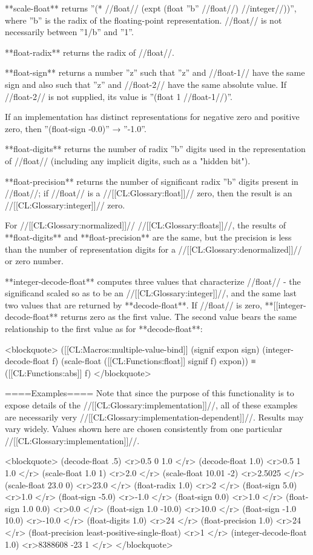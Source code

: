 **scale-float** returns ''(* //float// (expt (float ''b'' //float//) //integer//))'', where ''b'' is the radix of the floating-point representation. //float// is not necessarily between ''1/b'' and ''1''.

**float-radix** returns the radix of //float//.

**float-sign** returns a number ''z'' such that ''z'' and //float-1// have the same sign and also such that ''z'' and //float-2// have the same absolute value. If //float-2// is not supplied, its value is ''(float 1 //float-1//)''.

If an implementation has distinct representations for negative zero and positive zero, then ''(float-sign -0.0)'' → ''-1.0''.

**float-digits** returns the number of radix ''b'' digits used in the representation of //float// (including any implicit digits, such as a "hidden bit").

**float-precision** returns the number of significant radix ''b'' digits present in //float//; if //float// is a //[[CL:Glossary:float]]// zero, then the result is an //[[CL:Glossary:integer]]// zero.

For //[[CL:Glossary:normalized]]// //[[CL:Glossary:floats]]//, the results of **float-digits** and **float-precision** are the same, but the precision is less than the number of representation digits for a //[[CL:Glossary:denormalized]]// or zero number.

**integer-decode-float** computes three values that characterize //float// - the significand scaled so as to be an //[[CL:Glossary:integer]]//, and the same last two values that are returned by **decode-float**. If //float// is zero, **[[integer-decode-float** returns zero as the first value. The second value bears the same relationship to the first value as for **decode-float**:

<blockquote>
([[CL:Macros:multiple-value-bind]] (signif expon sign) 
    (integer-decode-float f) 
  (scale-float ([[CL:Functions:float]] signif f) expon)) ≡ ([[CL:Functions:abs]] f)
</blockquote>

====Examples====
Note that since the purpose of this functionality is to expose details of the //[[CL:Glossary:implementation]]//, all of these examples are necessarily very //[[CL:Glossary:implementation-dependent]]//. Results may vary widely. Values shown here are chosen consistently from one particular //[[CL:Glossary:implementation]]//.

<blockquote>
(decode-float .5) <r>0.5
0
1.0 </r>
(decode-float 1.0) <r>0.5
1
1.0 </r>
(scale-float 1.0 1) <r>2.0 </r>
(scale-float 10.01 -2) <r>2.5025 </r>
(scale-float 23.0 0) <r>23.0 </r>
(float-radix 1.0) <r>2 </r>
(float-sign 5.0) <r>1.0 </r>
(float-sign -5.0) <r>-1.0 </r>
(float-sign 0.0) <r>1.0 </r>
(float-sign 1.0 0.0) <r>0.0 </r>
(float-sign 1.0 -10.0) <r>10.0 </r>
(float-sign -1.0 10.0) <r>-10.0 </r>
(float-digits 1.0) <r>24 </r>
(float-precision 1.0) <r>24 </r>
(float-precision least-positive-single-float) <r>1 </r>
(integer-decode-float 1.0) <r>8388608
-23
1 </r>
</blockquote>

